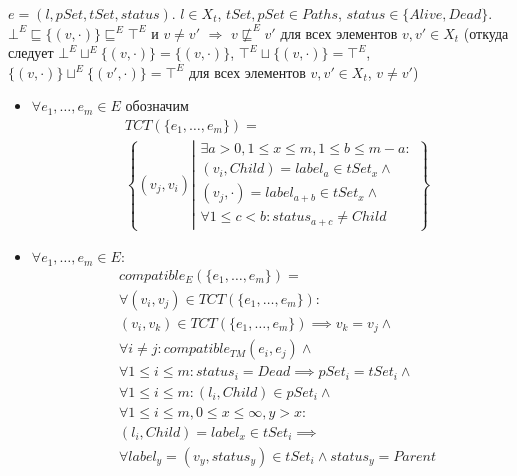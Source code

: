 $e = (l, pSet, tSet, status)$. $l \in X_t$, $tSet, pSet \in Paths$, $status \in \{Alive, Dead\}$.
$\bot^E \sqsubseteq \{(v, \cdot)\} \sqsubseteq^E \top^E$ и $v \neq v'$ $\Rightarrow$ $v \not\sqsubseteq^E v'$ для всех элементов $v, v'\in X_t$ 
(откуда следует $\bot^E \sqcup^E \{(v, \cdot)\} = \{(v, \cdot)\}$, $\top^E \sqcup \{(v, \cdot)\} = \top^E$, $\{(v, \cdot)\} \sqcup^E \{(v', \cdot)\} = \top^E$ для всех элементов $v,v'\in X_t$, $v\neq v'$)

\begin{itemize}
\item $\forall e_1, \dots, e_m \in E$ обозначим
\begin{equation}
\label{tct}
\begin{aligned}
& TCT(\{e_1, \dots, e_m\}) = \\
& \left\lbrace (v_j, v_i) \left|
\begin{array}{c}
\exists a > 0, 1 \le x \le m, 1 \le b \le m - a: \\
(v_i, Child) = label_a \in tSet_x \land \\
(v_j, \cdot) = label_{a+b} \in tSet_x \land \\
\forall 1 \le c < b: status_{a+c} \neq Child
\end{array}
\right.
\right\rbrace
\end{aligned}
\end{equation}

\item $\forall e_1, \dots, e_m \in E:$
\begin{equation}
\label{compatible_E_thread_M}
\begin{aligned}
& compatible_{E}(\{e_1, \dots, e_m\}) = \\
& \forall (v_i, v_j) \in TCT(\{e_1, \dots, e_m\}): \\
& (v_i, v_k) \in TCT(\{e_1, \dots, e_m\}) \implies v_k = v_j \land \\
& \forall i \neq j: compatible_{TM}(e_i, e_j) \land \\
& \forall 1 \le i \le m: status_i = Dead \implies pSet_i = tSet_i \land \\
& \forall 1 \le i \le m: (l_i, Child) \in pSet_i \land \\
& \forall 1 \le i \le m, 0 \le x \le \infty, y > x: \\
& (l_i, Child) = label_x \in tSet_i \implies \\
& \forall label_y = (v_y, status_y) \in tSet_i \land status_y = Parent
\end{aligned}
\end{equation}


\end{itemize}
